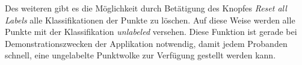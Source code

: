 Des weiteren gibt es die Möglichkeit durch Betätigung des Knopfes \textit{Reset all Labels} alle Klassifikationen der Punkte zu löschen. Auf diese Weise werden alle Punkte mit der Klassifikation \textit{unlabeled} versehen. Diese Funktion ist gerade bei Demonstrationszwecken der Applikation notwendig, damit jedem Probanden schnell, eine ungelabelte Punktwolke zur Verfügung gestellt werden kann. 